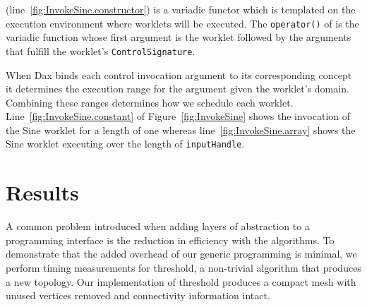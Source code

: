\documentclass[conference]{IEEEtran}
\newcommand{\Ci}[1]{\color{blue}{#1}} %
\newcommand{\Cu}[1]{{\textbf{#1}}} %
\newcommand{\Code}[1]{{\small\texttt{#1}}}
\begin{document}


\Code{\Ci{Schedule}} (line~\ref{fig:InvokeSine.constructor}) is a variadic functor which is templated on the
execution environment where worklets will be executed. The \Code{operator()} of \Code{\Ci{Schedule}} is the variadic function
whose first argument is the worklet followed by the arguments that
fulfill the worklet's \Code{ControlSignature}.

When Dax binds each control invocation argument to its corresponding concept it determines
the execution range for the argument given the worklet's domain. Combining these ranges determines
how we schedule each worklet. Line~\ref{fig:InvokeSine.constant} of Figure~\ref{fig:InvokeSine} shows
the invocation of the Sine worklet for a length of one whereas line~\ref{fig:InvokeSine.array}
shows the Sine worklet executing over the length of \Code{inputHandle}.

\section{Results}

\noindent
A common problem introduced when adding layers of abstraction to a
programming interface is the reduction in efficiency with the algorithms.
To demonstrate that the added overhead of our generic programming is
minimal, we perform timing measurements for threshold, a non-trivial
algorithm that produces a new topology.  Our implementation of threshold
produces a compact mesh with unused vertices removed and connectivity
information intact.
\end{document}
